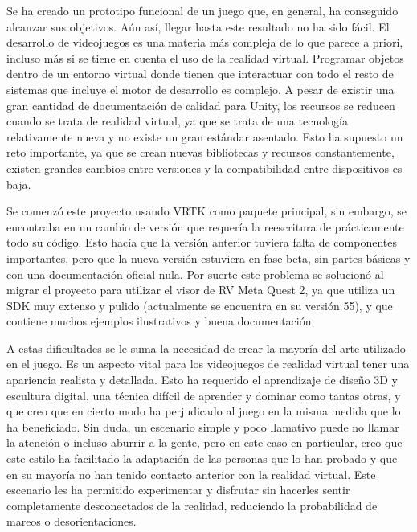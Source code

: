 \vspace{5mm}



Se ha creado un prototipo funcional de un juego que, en general, ha conseguido alcanzar sus objetivos. Aún así, llegar hasta este resultado no ha sido fácil. El desarrollo de videojuegos es una materia más compleja de lo que parece a priori, incluso más si se tiene en cuenta el uso de la realidad virtual. Programar objetos dentro de un entorno virtual donde tienen que interactuar con todo el resto de sistemas que incluye el motor de desarrollo es complejo. A pesar de existir una gran cantidad de documentación de calidad para Unity, los recursos se reducen cuando se trata de realidad virtual, ya que se trata de una tecnología relativamente nueva y no existe un gran estándar asentado. Esto ha supuesto un reto importante, ya que se crean nuevas bibliotecas y recursos constantemente, existen grandes cambios entre versiones y la compatibilidad entre dispositivos es baja. 

Se comenzó este proyecto usando VRTK como paquete principal, sin embargo, se encontraba en un cambio de versión que requería la reescritura de prácticamente todo su código. Esto hacía que la versión anterior tuviera falta de componentes importantes, pero que la nueva versión estuviera en fase beta, sin partes básicas y con una documentación oficial nula. Por suerte este problema se solucionó al migrar el proyecto para utilizar el visor de RV Meta Quest 2, ya que utiliza un SDK muy extenso y pulido (actualmente se encuentra en su versión 55), y que contiene muchos ejemplos ilustrativos y buena documentación.


A estas dificultades se le suma la necesidad de crear la mayoría del arte utilizado en el juego. Es un aspecto vital para los videojuegos de realidad virtual tener una apariencia realista y detallada. Esto ha requerido el aprendizaje de diseño 3D y escultura digital, una técnica difícil de aprender y dominar como tantas otras, y que creo que en cierto modo ha perjudicado al juego en la misma medida que lo ha beneficiado. Sin duda, un escenario simple y poco llamativo puede no llamar la atención o incluso aburrir a la gente, pero en este caso en particular, creo que este estilo ha facilitado la adaptación de las personas que lo han probado y que en su mayoría no han tenido contacto anterior con la realidad virtual. Este escenario les ha permitido experimentar y disfrutar sin hacerles sentir completamente desconectados de la realidad, reduciendo la probabilidad de mareos o desorientaciones.

